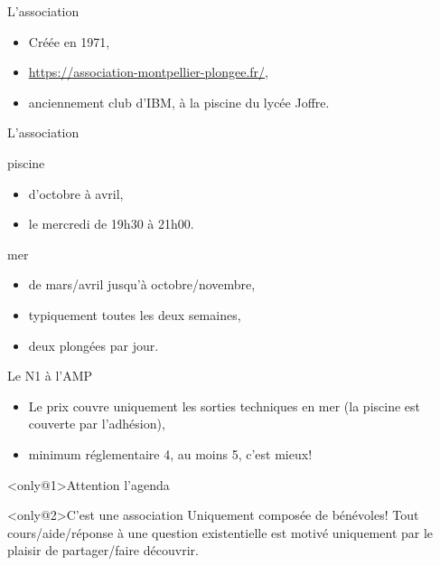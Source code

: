 \begin{frame}{L'association}
\begin{itemize}
\item Créée en 1971,
\item \url{https://association-montpellier-plongee.fr/},
\item anciennement club d'IBM, à la piscine du lycée Joffre.
\end{itemize}
\end{frame}

\begin{frame}{L'association}
\begin{block}{piscine}
\begin{itemize}
\item d'octobre à avril, 
\item le mercredi de 19h30 à 21h00.
\end{itemize}
\end{block}
\begin{block}{mer}
\begin{itemize}
\item de mars/avril jusqu'à octobre/novembre,
\item typiquement toutes les deux semaines,
\item deux plongées par jour.
\end{itemize}
\end{block}
\end{frame}

\begin{frame}{Le N1 à l'AMP}
\begin{itemize}
\item Le prix couvre uniquement les sorties techniques en mer
  (la piscine est couverte par l'adhésion),
\item minimum réglementaire 4, au moins 5, c'est mieux!
\end{itemize}

\begin{alertblock}<only@1>{Attention l'agenda}
\end{alertblock}

\begin{exampleblock}<only@2>{C'est une association}
Uniquement composée de bénévoles! Tout cours/aide/réponse à une question
existentielle est motivé uniquement par le plaisir de partager/faire découvrir.
\end{exampleblock}

\end{frame}
